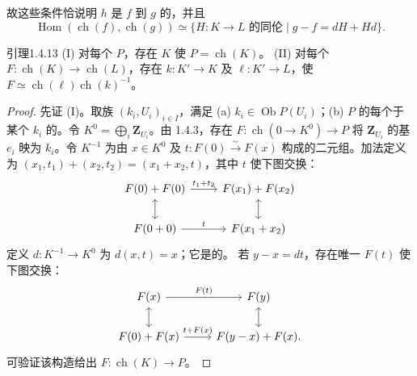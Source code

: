 故这些条件恰说明 $h$ 是 $f$ 到 $g$ 的，并且
\[\operatorname{Hom}(\operatorname{ch}(f),\operatorname{ch}(g))\simeq\{H:K\to L\text{ 的同伦}\mid g-f=dH+Hd\}.\tag{1.4.12.4}\]
\begin{SGAresult}{引理}{1.4.13}
(I) 对每个  $P$，存在 $K$ 使 $P=\operatorname{ch}(K)$。
(II) 对每个 $F:\operatorname{ch}(K)\to\operatorname{ch}(L)$，存在 $k:K'\to K$ 及 $\ell:K'\to L$，使 $F\simeq\operatorname{ch}(\ell)\operatorname{ch}(k)^{-1}$。
\end{SGAresult}
\begin{proof}
先证 (I)。取族 $(k_i,U_i)_{i\in I}$，满足 (a) $k_i\in\operatorname{Ob}P(U_i)$；(b) $P$ 的每个于某个 $k_i$ 的。令 $K^0=\bigoplus_i\mathbf Z_{U_i}$。由 1.4.3，存在 $F:\operatorname{ch}(0\to K^0)\to P$ 将 $\mathbf Z_{U_i}$ 的基 $e_i$ 映为 $k_i$。令 $K^{-1}$ 为由 $x\in K^0$ 及 $t:F(0)\xrightarrow\sim F(x)$ 构成的二元组。加法定义为 $(x_1,t_1)+(x_2,t_2)=(x_1+x_2,t)$，其中 $t$ 使下图交换：
\[\begin{tikzcd}F(0)+F(0)\arrow[r,"t_1+t_2"]&F(x_1)+F(x_2)\\F(0+0)\arrow[u,leftrightarrow]\arrow[r,"t"]&F(x_1+x_2)\arrow[u,leftrightarrow]\end{tikzcd}\]
定义 $d:K^{-1}\to K^0$ 为 $d(x,t)=x$；它是的。
若 $y-x=dt$，存在唯一 $F(t)$ 使下图交换：
\[\begin{tikzcd}F(x)\arrow[r,"F(t)"]\arrow[d,leftrightarrow]&F(y)\arrow[d,leftrightarrow]\\F(0)+F(x)\arrow[r,"t+F(x)"]&F(y-x)+F(x).\end{tikzcd}\]
可验证该构造给出 $F:\operatorname{ch}(K)\to P$。


\end{proof}
